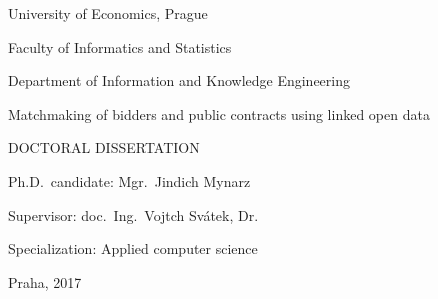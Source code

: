 \begin{titlepage}
    \begin{center}
        \begingroup 
        \sffamily

        \large
        University of Economics, Prague
        
        \small
        Faculty of Informatics and Statistics
        
        Department of Information and Knowledge Engineering

        \vfill

        \LARGE
        Matchmaking of bidders and public contracts using linked open data
        
        \normalsize
        \uppercase{Doctoral dissertation}

        \vspace{4cm}
       
        \small
        Ph.D.~candidate: Mgr.~Jind\rhacek{}ich Mynarz

        Supervisor: doc.~Ing.~Vojt\ehacek{}ch Svátek, Dr.

        Specialization: Applied computer science

        \vfill
        
        Praha, 2017

        \endgroup
    \end{center}
\end{titlepage}
